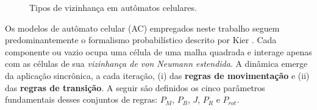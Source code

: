 \documentclass[12pt,oneside]{report}
\begin{document}
\begin{figure}[H]
    \centering
    \hspace{0.05\textwidth}
    \hspace{0.05\textwidth}
    \caption{\small Tipos de vizinhança em autômatos celulares.}
    \label{fig:tipos_vizinhança}
\end{figure}

Os modelos de autômato celular (AC) empregados neste trabalho seguem predominantemente o formalismo probabilístico descrito por Kier \cite{kier2005}. Cada componente ou vazio ocupa uma célula de uma malha quadrada e interage apenas com as células de sua \textit{vizinhança de von Neumann estendida}. A dinâmica emerge da aplicação sincrônica, a cada iteração, (i) das \textbf{regras de movimentação} e (ii) das \textbf{regras de transição}. A seguir são definidos os cinco parâmetros fundamentais desses conjuntos de regras: $P_M$, $P_B$, $J$, $P_R$ e $P_{rot}$.
\end{document}

